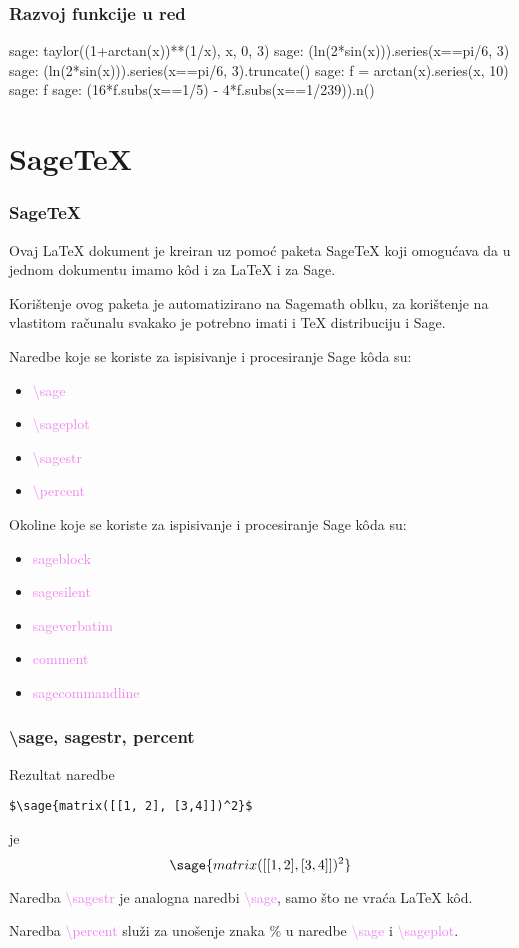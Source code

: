 \documentclass{beamer}
\begin{document}
\begin{frame}[fragile]\frametitle{Razvoj funkcije u red}
\begin{sagecommandline}
  sage: taylor((1+arctan(x))**(1/x), x, 0, 3)
  sage: (ln(2*sin(x))).series(x==pi/6, 3)
  sage: (ln(2*sin(x))).series(x==pi/6, 3).truncate()
  sage: f = arctan(x).series(x, 10)
  sage: f
  sage: (16*f.subs(x==1/5) - 4*f.subs(x==1/239)).n()
\end{sagecommandline}
\end{frame}

\section{Sage\TeX}

\begin{frame}\frametitle{Sage\TeX}
Ovaj \LaTeX{} dokument je kreiran uz pomoć paketa Sage\TeX{} koji omogućava da u jednom dokumentu imamo k\^od i za \LaTeX{} i za Sage.

Korištenje ovog paketa je automatizirano na Sagemath oblku, za korištenje na vlastitom računalu svakako je potrebno imati i \TeX{} distribuciju i Sage.

Naredbe koje se koriste za ispisivanje i procesiranje Sage k\^oda su:

\begin{itemize}
  \item \textcolor{violet}{\textbackslash sage}
  \item \textcolor{violet}{\textbackslash sageplot}
  \item \textcolor{violet}{\textbackslash sagestr}
  \item \textcolor{violet}{\textbackslash percent}
\end{itemize}

Okoline koje se koriste za ispisivanje i procesiranje Sage k\^oda su:
\begin{itemize}
  \item \textcolor{violet}{sageblock}
  \item \textcolor{violet}{sagesilent}
  \item \textcolor{violet}{sageverbatim}
  \item \textcolor{violet}{comment}
  \item \textcolor{violet}{sagecommandline}
\end{itemize}
\end{frame}

\begin{frame}[fragile]\frametitle{\textbackslash sage, sagestr, percent}
Rezultat naredbe
\begin{lstlisting}
$\sage{matrix([[1, 2], [3,4]])^2}$
\end{lstlisting}
je
\[\sage{matrix([[1, 2], [3,4]])^2}\]

Naredba \textcolor{violet}{\textbackslash sagestr} je analogna naredbi \textcolor{violet}{\textbackslash sage}, samo što ne vraća \LaTeX{} k\^od.

Naredba \textcolor{violet}{\textbackslash percent} služi za unošenje znaka \% u naredbe \textcolor{violet}{\textbackslash sage} i \textcolor{violet}{\textbackslash sageplot}.
\end{frame}
\end{document}
